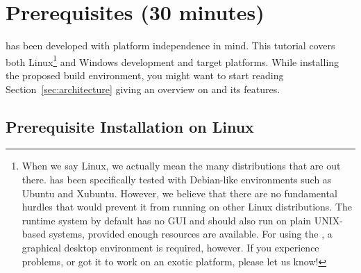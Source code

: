 %
% 
%
%
%
%

\section{Prerequisites (30 minutes)}
\label{sec:prereq}

\xme has been developed with platform independence in mind.
This tutorial covers both Linux\footnote{%
	When we say Linux, we actually mean the many distributions that are out there.
	\xme has been specifically tested with Debian-like environments such as Ubuntu and Xubuntu.
	However, we believe that there are no fundamental hurdles that would prevent it from running on other Linux distributions.
	The \xme runtime system by default has no GUI and should also run on plain UNIX-based systems, provided enough resources are available.
	For using the \xmt, a graphical desktop environment is required, however.
	If you experience problems, or got it to work on an exotic platform, please let us know!
} and Windows development and target platforms.
%
While installing the proposed build environment, you might want to start reading Section~\ref{sec:architecture} giving an overview on \xme and its features.

\subsection{Prerequisite Installation on Linux}
\label{sec:prereq:linux}

